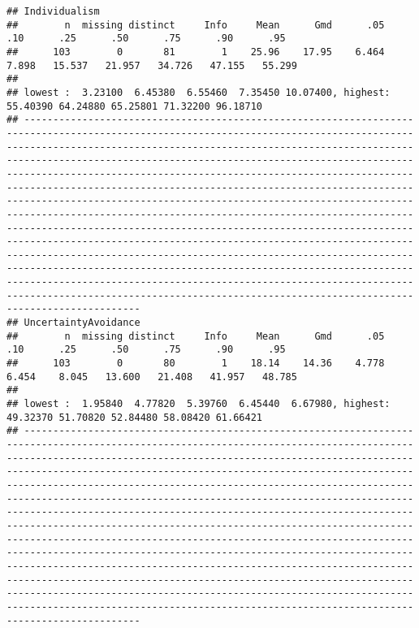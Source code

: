 \documentclass[]{article}
\begin{document}
\begin{verbatim}
## Individualism 
##        n  missing distinct     Info     Mean      Gmd      .05      .10      .25      .50      .75      .90      .95 
##      103        0       81        1    25.96    17.95    6.464    7.898   15.537   21.957   34.726   47.155   55.299 
## 
## lowest :  3.23100  6.45380  6.55460  7.35450 10.07400, highest: 55.40390 64.24880 65.25801 71.32200 96.18710
## ----------------------------------------------------------------------------------------------------------------------------------------------------------------------------------------------------------------------------------------------------------------------------------------------------------------------------------------------------------------------------------------------------------------------------------------------------------------------------------------------------------------------------------------------------------------------------------------------------------------------------------------------------------------------------------------------------------------------------------------------------------------------------------------------------------------------------------------------------------------------------------------------------------------------------------------------------------------------------------------------------------------------------------------
## UncertaintyAvoidance 
##        n  missing distinct     Info     Mean      Gmd      .05      .10      .25      .50      .75      .90      .95 
##      103        0       80        1    18.14    14.36    4.778    6.454    8.045   13.600   21.408   41.957   48.785 
## 
## lowest :  1.95840  4.77820  5.39760  6.45440  6.67980, highest: 49.32370 51.70820 52.84480 58.08420 61.66421
## ----------------------------------------------------------------------------------------------------------------------------------------------------------------------------------------------------------------------------------------------------------------------------------------------------------------------------------------------------------------------------------------------------------------------------------------------------------------------------------------------------------------------------------------------------------------------------------------------------------------------------------------------------------------------------------------------------------------------------------------------------------------------------------------------------------------------------------------------------------------------------------------------------------------------------------------------------------------------------------------------------------------------------------------
\end{verbatim}
\end{document}

